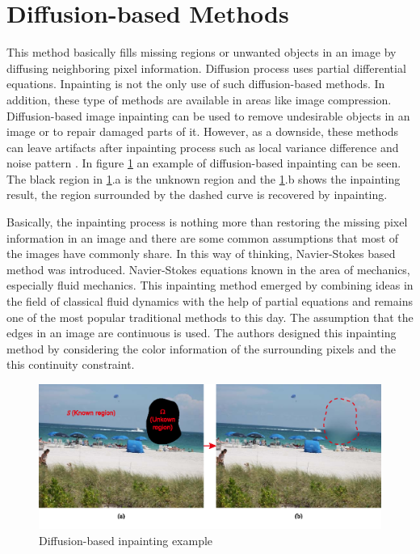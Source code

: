 \section{Diffusion-based Methods}

This method basically fills missing regions or unwanted objects in an image by diffusing neighboring pixel information. Diffusion process uses partial differential equations. Inpainting is not the only use of such diffusion-based methods. In addition, these type of methods are available in areas like image compression. Diffusion-based image inpainting can be used to remove undesirable objects in an image or to repair damaged parts of it. However, as a downside, these methods can leave artifacts after inpainting process such as local variance difference and noise pattern \cite{diffusion_based_artifacts}. In figure \ref{fig:diffusion_based_inpainting} an example of diffusion-based inpainting can be seen. The black region in \ref{fig:diffusion_based_inpainting}.a is the unknown region and the \ref{fig:diffusion_based_inpainting}.b shows the inpainting result, the region surrounded by the dashed curve is recovered by inpainting.

Basically, the inpainting process is nothing more than restoring the missing pixel information in an image and there are some common assumptions that most of the images have commonly share. In this way of thinking, Navier-Stokes based method \cite{navier_stokes} was introduced. Navier-Stokes equations known in the area of mechanics, especially fluid mechanics. This inpainting method emerged by combining ideas in the field of classical fluid dynamics with the help of partial equations and remains one of the most popular traditional methods to this day. The assumption that the edges in an image are continuous is used. The authors designed this inpainting method by considering the color information of the surrounding pixels and the this continuity constraint.

\begin{figure}[h]
    \centering
    \includegraphics[width=14cm]{figures/chapter2/diffusion_based_inpainting.png}
    \caption{Diffusion-based inpainting example \cite{diffusion_based_inpainting}}
    \label{fig:diffusion_based_inpainting}
\end{figure}

